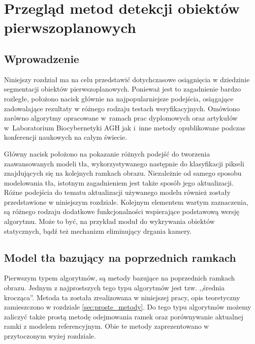 \chapter{Przegląd metod detekcji obiektów pierwszoplanowych}
\label{cha:przeglad_metod}

\section{Wprowadzenie}
\label{sec:przeglad_wprowadzenie}

Niniejszy rozdział ma na celu przedstawić dotychczasowe osiągnięcia w dziedzinie segmentacji obiektów pierwszoplanowych. Ponieważ jest to zagadnienie bardzo rozległe, położono nacisk głównie na najpopularniejsze podejścia, osiągające zadowalające rezultaty w różnego rodzaju testach weryfikacyjnych. Omówiono zarówno algorytmy opracowane w~ramach prac dyplomowych oraz artykułów w~Laboratorium Biocybernetyki AGH jak i~inne metody opublikowane podczas konferencji naukowych na całym świecie. 

Główny nacisk położono na pokazanie różnych podejść do tworzenia zaawansowanych modeli tła, wykorzystywanego następnie do klasyfikacji pikseli znajdujących się na kolejnych ramkach obrazu. Niezależnie od samego sposobu modelowania tła, istotnym zagadnieniem jest także sposób jego aktualizacji. Różne podejścia do tematu aktualizacji używanego modelu również zostały przedstawione w niniejszym rozdziale. Kolejnym elementem wartym zaznaczenia, są różnego rodzaju dodatkowe funkcjonalności wspierające podstawową wersję algorytmu. Może to być, na przykład moduł do wykrywania obiektów statycznych, bądź też mechanizm eliminujący drgania kamery.


\section{Model tła bazujący na poprzednich ramkach}
\label{sec:model_poprzednie_ramki}

Pierwszym typem algorytmów, są metody bazujące na poprzednich ramkach obrazu. Jednym z najprostszych tego typu algorytmów jest tzw. ,,średnia krocząca''. Metoda ta została zrealizowana w niniejszej pracy, opis teoretyczny zamieszczono w rozdziale \ref{sec:proste_metody}. Do tego typu algorytmów możemy zaliczyć także prostą metodę odejmowania ramek oraz porównywanie aktualnej ramki z modelem referencyjnym. Obie te metody zaprezentowano w przytoczonym wyżej rozdziale.

